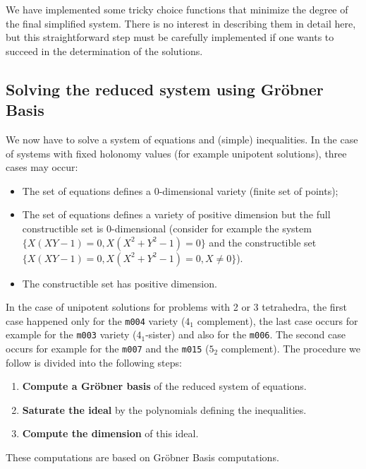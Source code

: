We have implemented some tricky choice functions that minimize the degree of the final simplified system. There is no interest in describing them in detail here, but this straightforward step must be carefully implemented if one wants to succeed in the determination of the solutions.


\subsection{Solving the reduced system using Gröbner Basis}
We now have to solve a system of equations and (simple) inequalities.
In the case of systems with fixed holonomy values (for example
unipotent solutions), three cases may occur:%
\begin{itemize}
\item[---]
The set of equations defines a 0-dimensional variety (finite set of points);
\item[---]
The set of equations defines a variety of positive dimension but the
full constructible set is 0-dimensional (consider for example the
system $\{X(XY-1)=0,X(X^2+Y^2-1)=0\}$ and the constructible set
$\{X(XY-1)=0,X(X^2+Y^2-1)=0,X\neq 0\}$).
\item[---]
The constructible set has positive dimension.
\end{itemize}
In the case of unipotent solutions for problems with 2 or 3
tetrahedra, the first case happened only for the {\tt m004} variety
($4_1$ complement), the last case occurs for example for the {\tt m003} variety ($4_1$-sister) and also for the {\tt m006}.
The second case occurs for example for the {\tt m007} and the {\tt m015} ($5_2$ complement).
The procedure we follow is divided into the following steps:
\begin{enumerate}
\item {\bf Compute a Gr\"obner basis} of the reduced system of equations. %
\item {\bf Saturate the ideal} by the polynomials defining the inequalities. %
\item {\bf Compute the dimension} of this ideal. %
\end{enumerate}
These computations are based on Gröbner Basis computations.

